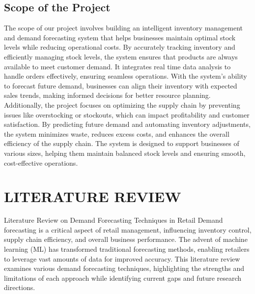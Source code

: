 \documentclass[10pt]{report}
\begin{document}
\begin{center}
\section{Scope of the Project}
\hspace{0.5cm}
The scope of our project involves building an intelligent inventory management and demand forecasting system that helps businesses maintain optimal stock levels while reducing operational costs. By accurately tracking inventory and efficiently managing stock levels, the system ensures that products are always available to meet customer demand. It integrates real time data analysis to handle orders effectively, ensuring seamless operations. With the system's ability to forecast future demand, businesses can align their inventory with expected sales trends, making informed decisions for better resource planning.\\
Additionally, the project focuses on optimizing the supply chain by preventing issues like overstocking or stockouts, which can impact profitability and customer satisfaction. By predicting future demand and automating inventory adjustments, the system minimizes waste, reduces excess costs, and enhances the overall efficiency of the supply chain. The system is designed to support businesses of various sizes, helping them maintain balanced stock levels and ensuring smooth, cost-effective operations.


\chapter{LITERATURE REVIEW}
Literature Review on Demand Forecasting Techniques in Retail
Demand forecasting is a critical aspect of retail management, influencing inventory control, supply chain efficiency, and overall business performance. The advent of machine learning (ML) has transformed traditional forecasting methods, enabling retailers to leverage vast amounts of data for improved accuracy. This literature review examines various demand forecasting techniques, highlighting the strengths and limitations of each approach while identifying current gaps and future research directions.

\end{center}
\end{document}

